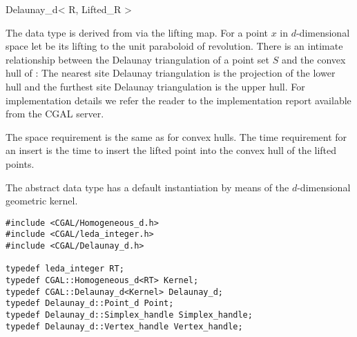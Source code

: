 \begin{ccRefClass}{Delaunay_d< R, Lifted_R >}






\ccImplementation

The data type is derived from  via
the lifting map. For a point $x$ in $d$-dimensional space let
 be its lifting to the unit paraboloid of revolution. There
is an intimate relationship between the Delaunay triangulation of a
point set $S$ and the convex hull of : The nearest site
Delaunay triangulation is the projection of the lower hull and the
furthest site Delaunay triangulation is the upper hull.  For
implementation details we refer the reader to the implementation
report available from the CGAL server.

The space requirement is the same as for convex hulls. The time
requirement for an insert is the time to insert the lifted point
into the convex hull of the lifted points. 



\ccExample



The abstract data type  has a default instantiation by
means of the $d$-dimensional geometric kernel.

\begin{verbatim}
#include <CGAL/Homogeneous_d.h>
#include <CGAL/leda_integer.h>
#include <CGAL/Delaunay_d.h>

typedef leda_integer RT;
typedef CGAL::Homogeneous_d<RT> Kernel;
typedef CGAL::Delaunay_d<Kernel> Delaunay_d;
typedef Delaunay_d::Point_d Point;
typedef Delaunay_d::Simplex_handle Simplex_handle;
typedef Delaunay_d::Vertex_handle Vertex_handle;


\end{verbatim}
\end{ccRefClass}
